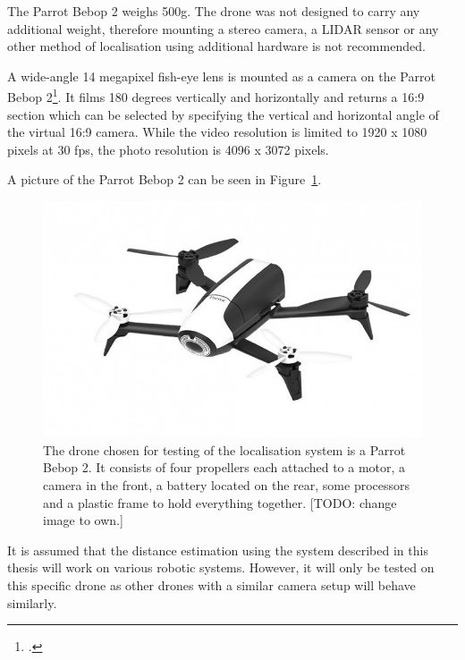 The Parrot Bebop 2 weighs 500g. The drone was not designed to carry any additional weight, therefore mounting a stereo camera, a LIDAR sensor or any other method of localisation using additional hardware is not recommended.

A wide-angle 14 megapixel fish-eye lens is mounted as a camera on the Parrot Bebop 2\footcite{parrotBebop2}. It films 180 degrees vertically and horizontally and returns a 16:9 section which can be selected by specifying the vertical and horizontal angle of the virtual 16:9 camera. While the video resolution is limited to 1920 x 1080 pixels at 30 fps, the photo resolution is 4096 x 3072 pixels.

A picture of the Parrot Bebop 2 can be seen in Figure~\ref{pic:introduction_equipment_parrotBebop2}.

\begin{figure}[h]
	\centering
	\includegraphics[width=4.5in]{img/introduction_equipment_parrotBebop2.jpg}
	\caption{The drone chosen for testing of the localisation system is a Parrot Bebop 2. It consists of four propellers each attached to a motor, a camera in the front, a battery located on the rear, some processors and a plastic frame to hold everything together. [TODO: change image to own.]}
	\label{pic:introduction_equipment_parrotBebop2}
\end{figure}

It is assumed that the distance estimation using the system described in this thesis will work on various robotic systems. However, it will only be tested on this specific drone as other drones with a similar camera setup will behave similarly.

\filbreak
